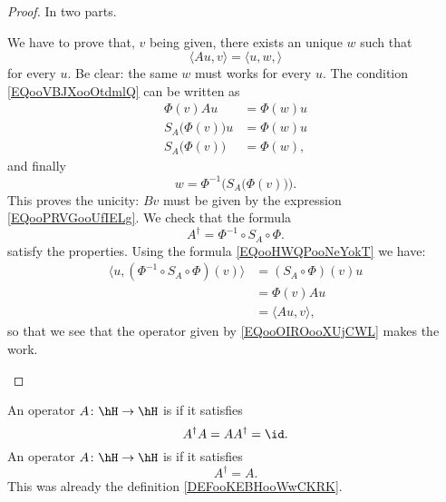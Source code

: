\begin{proof}
	In two parts.
	\begin{subproof}
		\spitem[Unicity]
		We have to prove that, \( v\) being given, there exists an unique \( w\) such that
		\begin{equation}        \label{EQooVBJXooOtdmlQ}
			\langle Au, v\rangle =\langle u,w, \rangle
		\end{equation}
		for every \( u\). Be clear: the same \( w\) must works for every \( u\). The condition \eqref{EQooVBJXooOtdmlQ} can be written as
		\begin{subequations}
			\begin{align}
				\Phi(v)Au               & =\Phi(w)u \\
				S_A\big( \Phi(v) \big)u & =\Phi(w)u \\
				S_A\big( \Phi(v) \big)  & =\Phi(w),
			\end{align}
		\end{subequations}
		and finally
		\begin{equation}
			w=\Phi^{-1}\Big( S_A\big( \Phi(v) \big) \Big).      \label{EQooPRVGooUfIELg}
		\end{equation}
		This proves the unicity: \( Bv\) must be given by the expression \eqref{EQooPRVGooUfIELg}.
		\spitem[Existence]
		We check that the formula
		\begin{equation}        \label{EQooOIROooXUjCWL}
			A^{\dag}=\Phi^{-1}\circ S_A\circ \Phi.
		\end{equation}
		satisfy the properties. Using the formula \eqref{EQooHWQPooNeYokT} we have:
		\begin{subequations}
			\begin{align}
				\langle u, (\Phi^{-1}\circ S_A\circ \Phi)(v)\rangle & =(S_A\circ\Phi)(v)u     \\
				                                                    & =\Phi(v)Au              \\
				                                                    & =\langle Au, v\rangle ,
			\end{align}
		\end{subequations}
		so that we see that the operator given by \eqref{EQooOIROooXUjCWL} makes the work.
	\end{subproof}
\end{proof}

\begin{definition}      \label{DEFooOKGXooFCzCHu}
	An operator \( A\colon \hH\to \hH\) is  if it satisfies
	\begin{equation}
		A^{\dag}A=AA^{\dag}=\id.
	\end{equation}
	An operator \( A\colon \hH\to \hH\) is  if it satisfies
	\begin{equation}
		A^{\dag}=A.
	\end{equation}
	This was already the definition \ref{DEFooKEBHooWwCKRK}.
\end{definition}

